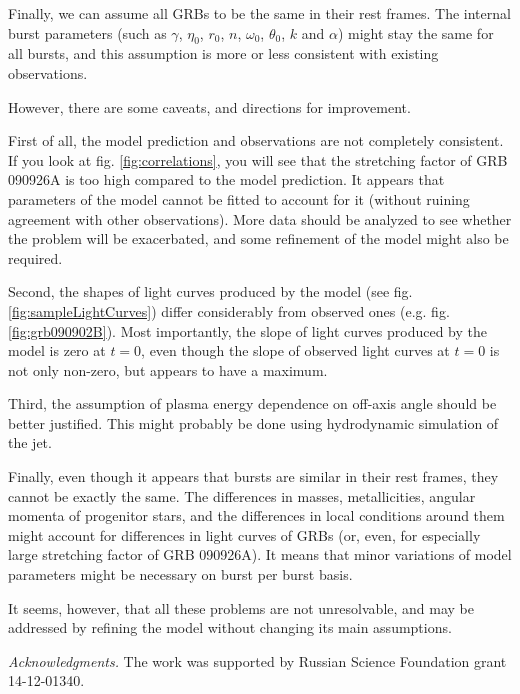 \documentclass[11pt,a4paper]{article}
\begin{document}
Finally, we can assume all GRBs to be the same in their rest frames.
The internal burst parameters (such as $\gamma$, $\eta_0$, $r_0$, $n$, $\omega_0$, $\theta_0$, $k$ and $\alpha$) might stay the same for all bursts, and this assumption is more or less consistent with existing observations.

However, there are some caveats, and directions for improvement.

First of all, the model prediction and observations are not completely consistent.
If you look at fig. \ref{fig:correlations}, you will see that the stretching factor of GRB 090926A is too high compared to the model prediction.
It appears that parameters of the model cannot be fitted to account for it (without ruining agreement with other observations).
More data should be analyzed to see whether the problem will be exacerbated, and some refinement of the model might also be required.

Second, the shapes of light curves produced by the model (see fig. \ref{fig:sampleLightCurves}) differ considerably from observed ones (e.g. fig. \ref{fig:grb090902B}).
Most importantly, the slope of light curves produced by the model is zero at $t = 0$, even though the slope of observed light curves at $t = 0$ is not only non-zero, but appears to have a maximum.

Third, the assumption of plasma energy dependence on off-axis angle should be better justified.
This might probably be done using hydrodynamic simulation of the jet.

Finally, even though it appears that bursts are similar in their rest frames, they cannot be exactly the same.
The differences in masses, metallicities, angular momenta of progenitor stars, and the differences in local conditions around them might account for differences in light curves of GRBs (or, even, for especially large stretching factor of GRB 090926A).
It means that minor variations of model parameters might be necessary on burst per burst basis.

It seems, however, that all these problems are not unresolvable, and may be addressed by refining the model without changing its main assumptions.

{\small {\it Acknowledgments.} The work was supported by Russian Science Foundation grant 14-12-01340.}



\end{document}
